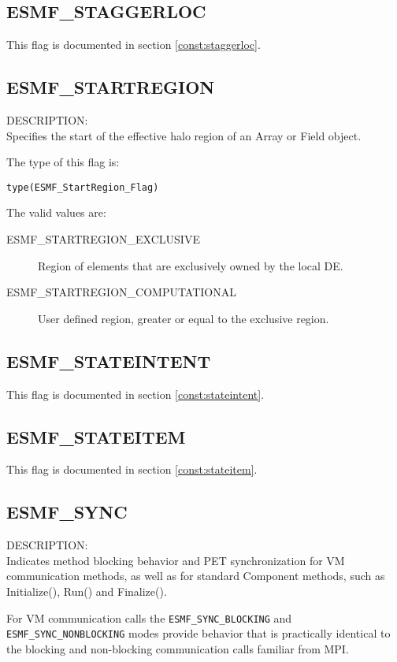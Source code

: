 \subsection{ESMF\_STAGGERLOC}
This flag is documented in section \ref{const:staggerloc}.

\subsection{ESMF\_STARTREGION}
\label{const:startregion}
{\sf DESCRIPTION:\\}
Specifies the start of the effective halo region of an Array or Field object.

The type of this flag is:

{\tt type(ESMF\_StartRegion\_Flag)}

The valid values are:
\begin{description}
\item [ESMF\_STARTREGION\_EXCLUSIVE]
      Region of elements that are exclusively owned by the local DE.
\item [ESMF\_STARTREGION\_COMPUTATIONAL]
      User defined region, greater or equal to the exclusive region.
\end{description}

\subsection{ESMF\_STATEINTENT}
This flag is documented in section \ref{const:stateintent}.

\subsection{ESMF\_STATEITEM}
This flag is documented in section \ref{const:stateitem}.

\subsection{ESMF\_SYNC}
\label{const:sync}
{\sf DESCRIPTION:\\}  
Indicates method blocking behavior and PET synchronization for VM communication
methods, as well as for standard Component methods, such as Initialize(), Run() 
and Finalize().

For VM communication calls the {\tt ESMF\_SYNC\_BLOCKING} and {\tt ESMF\_SYNC\_NONBLOCKING}
modes provide behavior that is practically identical to the blocking and
non-blocking communication calls familiar from MPI.

